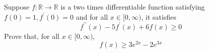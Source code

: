 Suppose $f:\mathbb{R}\to \mathbb{R}$ is a two times differentiable function satisfying $f(0)=1,f^{\prime}(0)=0$ and for all $x\in [0,\infty)$, it satisfies
\[ f^{\prime \prime}(x)-5f^{\prime}(x)+6f(x)\ge 0 \]
Prove that, for all $x\in [0,\infty)$,
\[ f(x)\ge 3e^{2x}-2e^{3x} \]